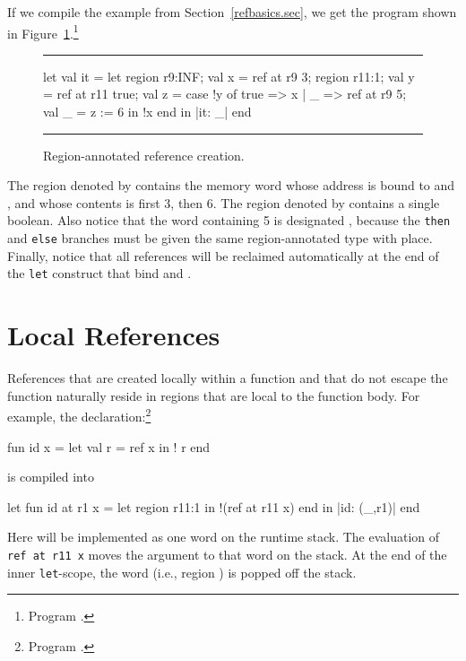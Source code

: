 \documentclass[12pt]{book}
\begin{document}
If we compile the example from Section~\ref{refbasics.sec}, we get the program
shown in Figure~\ref{otherrefs.fig}.\footnote{Program .}
\begin{figure}
\hrule
\medskip
\begin{smlcode}
   let val it =
         let region r9:INF;
             val x = ref at r9 3;
             region r11:1;
             val y = ref at r11 true;
             val z = case !y of true => x | _ => ref at r9 5;
             val _ = z := 6
         in  !x
         end
   in  {|it: _|}
   end
\end{smlcode}
\caption{Region-annotated reference creation.}
\label{otherrefs.fig}
\medskip
\hrule
\end{figure}
The region denoted by  contains the memory word whose address is bound to
 and , and whose contents is first 3, then 6.  The region denoted by
 contains a single boolean.  Also notice that the word containing 5 is
designated , because the \lstinline{then} and \lstinline{else} branches
must be given the same region-annotated type with place. Finally, notice that
all references will be reclaimed automatically at the end of the \lstinline{let}
construct that bind  and .

\section{Local References}

References
%
%
%
that are created locally within a function and that do not escape the function
naturally reside in regions that are local to the function body.  For example,
the declaration:\footnote{Program .}
\begin{smlcode}
  fun id x = let val r = ref x in ! r end
\end{smlcode}
is compiled into
\begin{smlcode}
  let fun id at r1 x =
          let region r11:1 in !(ref at r11 x) end
  in  {|id: (_,r1)|}
  end
\end{smlcode}
Here  will be implemented as one word on the runtime stack.  The
evaluation of \lstinline!ref at r11 x! moves the argument  to that word on
the stack. At the end of the inner \lstinline{let}-scope, the word (i.e., region
) is popped off the stack.
\end{document}
